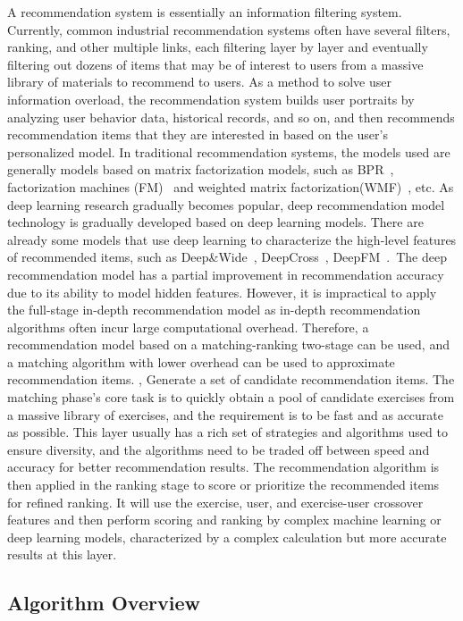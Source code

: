 A recommendation system is essentially an information filtering system. Currently, common industrial recommendation systems often have several filters, ranking, and other multiple links, each filtering layer by layer and eventually filtering out dozens of items that may be of interest to users from a massive library of materials to recommend to users. As a method to solve user information overload, the recommendation system builds user portraits by analyzing user behavior data, historical records, and so on, and then recommends recommendation items that they are interested in based on the user's personalized model. In traditional recommendation systems, the models used are generally models based on matrix factorization models, such as BPR~\cite{rendle2012bpr}, factorization machines (FM)~\cite{koren2008factorization} and weighted matrix factorization(WMF)~\cite{hu2008collaborative}, etc. As deep learning research gradually becomes popular, deep recommendation model technology is gradually developed based on deep learning models. There are already some models that use deep learning to characterize the high-level features of recommended items, such as Deep\&Wide~\cite{cheng2016wide}, DeepCross~\cite{shan2016deep}, DeepFM~\cite{guo2017deepfm}.\ The deep recommendation model has a partial improvement in recommendation accuracy due to its ability to model hidden features. However, it is impractical to apply the full-stage in-depth recommendation model as in-depth recommendation algorithms often incur large computational overhead. Therefore, a recommendation model based on a matching-ranking two-stage can be used, and a matching algorithm with lower overhead can be used to approximate recommendation items. , Generate a set of candidate recommendation items. The matching phase's core task is to quickly obtain a pool of candidate exercises from a massive library of exercises, and the requirement is to be fast and as accurate as possible. This layer usually has a rich set of strategies and algorithms used to ensure diversity, and the algorithms need to be traded off between speed and accuracy for better recommendation results. The recommendation algorithm is then applied in the ranking stage to score or prioritize the recommended items for refined ranking. It will use the exercise, user, and exercise-user crossover features and then perform scoring and ranking by complex machine learning or deep learning models, characterized by a complex calculation but more accurate results at this layer.

\subsection{Algorithm Overview}

